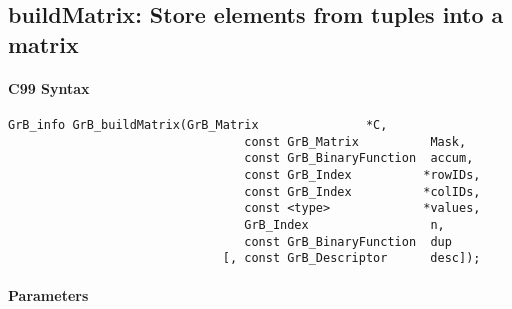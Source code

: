 \subsection{{\sf buildMatrix}: Store elements from tuples into a matrix}
\label{Sec:buildMatrix}

\paragraph{C99 Syntax}

\begin{Verbatim}[samepage=true]	
        GrB_info GrB_buildMatrix(GrB_Matrix               *C,
                                 const GrB_Matrix          Mask,
                                 const GrB_BinaryFunction  accum,
                                 const GrB_Index          *rowIDs,
                                 const GrB_Index          *colIDs, 
                                 const <type>             *values,
                                 GrB_Index                 n,
                                 const GrB_BinaryFunction  dup
                              [, const GrB_Descriptor      desc]);
\end{Verbatim}

\paragraph{Parameters}

